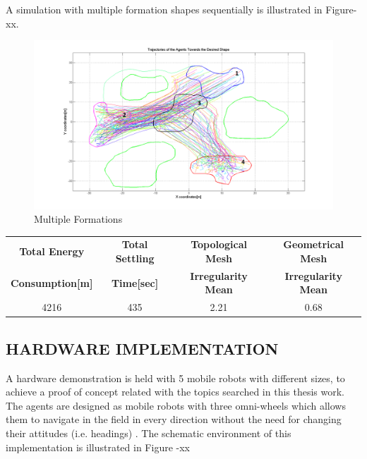 \documentclass[twoside]{article}
\begin{document}
		
A simulation with multiple formation shapes sequentially is illustrated in Figure-xx.


	\begin{figure}[H]
		\caption{Multiple Formations}
		\centerline{\includegraphics[scale = 0.45]{multiple_formation}}
	\end{figure} 
		
			\begin{center}
				 \label{tab:title} 
				\begin{tabular}{||c| c |c |c ||}
					
					\hline
					\textbf{Total Energy }  & \textbf{Total Settling} & \textbf{Topological Mesh} & \textbf{Geometrical Mesh} \\ \textbf{Consumption[m]} & \textbf{Time[sec]}& \textbf{Irregularity Mean} & \textbf{Irregularity Mean} \\
					\hline
					4216 & 435 &  2.21& 0.68\\
					\hline
				\end{tabular}
			\end{center}
		
		
		\subsection{HARDWARE IMPLEMENTATION}
		
   A hardware demonstration is held with 5 mobile robots with different sizes, to achieve a proof of concept related with the topics searched in this thesis work. The agents are designed as mobile robots with three omni-wheels which allows them to navigate in the field in every direction without the need for changing their attitudes (i.e. headings) .  The schematic environment of this implementation is illustrated in Figure -xx
   
\end{document}
